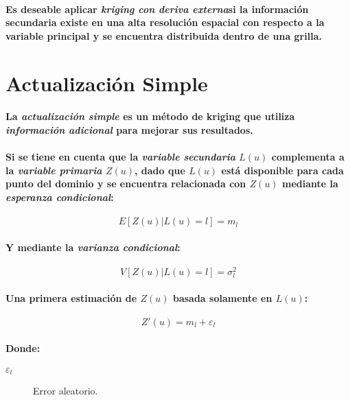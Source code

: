 \paragraph*{
Es deseable aplicar \emph{kriging con deriva externa}\footnotemark[24] si la información secundaria existe en una alta resolución espacial con respecto a la variable principal y se encuentra distribuida dentro de una grilla.
}



\section{Actualización Simple}
\paragraph{
La \emph{actualización simple} es un método de kriging que utiliza \emph{información adicional} para mejorar sus resultados.
}
\paragraph{
Si se tiene en cuenta que la \emph{variable secundaria} $L(u)$ complementa a la \emph{variable primaria} $Z(u)$, dado que $L(u)$ está disponible para cada punto del dominio y se encuentra relacionada con $Z(u)$ mediante la \emph{esperanza condicional}:
}
\begin{equation}
E[Z(u) | L(u) = l] = m_{l}
\end{equation}
\paragraph{
Y mediante la \emph{varianza condicional}:
}
\begin{equation}
V[Z(u)|L(u) = l] = \sigma_{l}^2
\end{equation}
\paragraph{
Una primera estimación de $Z(u)$ basada solamente en $L(u)$:
}
\begin{equation}
Z'(u) = m_l + \varepsilon_l
\end{equation}
\paragraph{
Donde:
}
\begin{description}
\item[$\varepsilon_l$] Error aleatorio.
\end{description}
